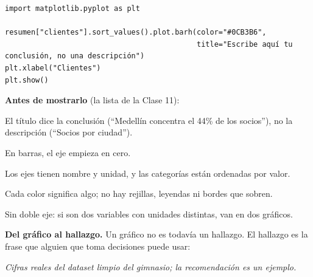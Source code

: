 \documentclass[11pt]{article}
\begin{document}
\begin{codigo}[title=En tu notebook: un gráfico completo]
\begin{Verbatim}
import matplotlib.pyplot as plt

resumen["clientes"].sort_values().plot.barh(color="#0CB3B6",
                                            title="Escribe aquí tu conclusión, no una descripción")
plt.xlabel("Clientes")
plt.show()
\end{Verbatim}
\end{codigo}

\textbf{Antes de mostrarlo} (la lista de la Clase 11):

\begin{checklist}
  \item El título dice la conclusión (``Medellín concentra el 44\% de los
    socios''), no la descripción (``Socios por ciudad'').
  \item En barras, el eje empieza en cero.
  \item Los ejes tienen nombre y unidad, y las categorías están ordenadas por valor.
  \item Cada color significa algo; no hay rejillas, leyendas ni bordes que sobren.
  \item Sin doble eje: si son dos variables con unidades distintas, van en dos gráficos.
\end{checklist}

\textbf{Del gráfico al hallazgo.} Un gráfico no es todavía un hallazgo. El
hallazgo es la frase que alguien que toma decisiones puede usar:

\begin{center}

{\footnotesize\itshape Cifras reales del dataset limpio del gimnasio; la recomendación es un ejemplo.}
\end{center}
\end{document}
